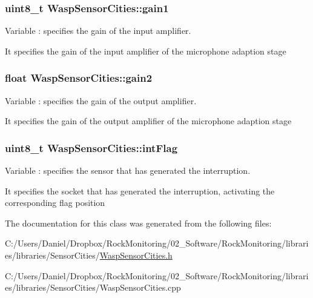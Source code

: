 \subsubsection[{\texorpdfstring{gain1}{gain1}}]{\setlength{\rightskip}{0pt plus 5cm}uint8\+\_\+t Wasp\+Sensor\+Cities\+::gain1}\hypertarget{class_wasp_sensor_cities_af1b4cd1f1ca6126d7ecd5fcd2fd7be01}{}\label{class_wasp_sensor_cities_af1b4cd1f1ca6126d7ecd5fcd2fd7be01}


Variable \+: specifies the gain of the input amplifier. 

It specifies the gain of the input amplifier of the microphone adaption stage 
\subsubsection[{\texorpdfstring{gain2}{gain2}}]{\setlength{\rightskip}{0pt plus 5cm}float Wasp\+Sensor\+Cities\+::gain2}\hypertarget{class_wasp_sensor_cities_a61bbb4272c2703d788c1a6f961513d70}{}\label{class_wasp_sensor_cities_a61bbb4272c2703d788c1a6f961513d70}


Variable \+: specifies the gain of the output amplifier. 

It specifies the gain of the output amplifier of the microphone adaption stage 
\subsubsection[{\texorpdfstring{int\+Flag}{intFlag}}]{\setlength{\rightskip}{0pt plus 5cm}uint8\+\_\+t Wasp\+Sensor\+Cities\+::int\+Flag}\hypertarget{class_wasp_sensor_cities_a6901c4228066c4501161bb4a09760f2c}{}\label{class_wasp_sensor_cities_a6901c4228066c4501161bb4a09760f2c}


Variable \+: specifies the sensor that has generated the interruption. 

It specifies the socket that has generated the interruption, activating the corresponding flag position 

The documentation for this class was generated from the following files\+:\begin{DoxyCompactItemize}
\item 
C\+:/\+Users/\+Daniel/\+Dropbox/\+Rock\+Monitoring/02\+\_\+\+Software/\+Rock\+Monitoring/libraries/libraries/\+Sensor\+Cities/\hyperlink{_wasp_sensor_cities_8h}{Wasp\+Sensor\+Cities.\+h}\item 
C\+:/\+Users/\+Daniel/\+Dropbox/\+Rock\+Monitoring/02\+\_\+\+Software/\+Rock\+Monitoring/libraries/libraries/\+Sensor\+Cities/Wasp\+Sensor\+Cities.\+cpp\end{DoxyCompactItemize}
